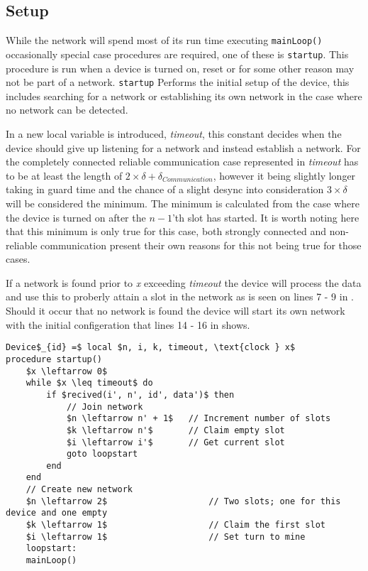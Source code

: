 \subsection{Setup} %
\label{sub:setup} 
While the network will spend most of its run time executing \texttt{mainLoop()} occasionally special case procedures are required, one of these is \texttt{startup}.
This procedure is run when a device is turned on, reset or for some other reason may not be part of a network. 
\texttt{startup} Performs the initial setup of the device, this includes searching for a network or establishing its own network in the case where no network can be detected.
 
\bigskip \noindent
In  a new local variable is introduced, \textit{timeout}, this constant decides when the device should give up listening for a network and instead establish a network.
For the completely connected reliable communication case represented in  \textit{timeout} has to be at least the length of $2 \times \delta + \delta_{Communication}$, however it being slightly longer taking in guard time and the chance of a slight desync into consideration $3 \times \delta$ will be considered the minimum.
The minimum is calculated from the case where the device is turned on after the $n-1$'th slot has started.
It is worth noting here that this minimum is only true for this case, both strongly connected and non-reliable communication present their own reasons for this not being true for those cases.

If a network is found prior to \textit{x} exceeding \textit{timeout} the device will process the data and use this to proberly attain a slot in the network as is seen on lines 7 - 9 in .
Should it occur that no network is found the device will start its own network with the initial configeration that lines 14 - 16 in  shows.
\begin{lstlisting}[label=lst:setup,style=pseudocode,mathescape=true,caption={Pseudocode example of the special case procedure startup()}]
Device$_{id} =$ local $n, i, k, timeout, \text{clock } x$
procedure startup()
	$x \leftarrow 0$
	while $x \leq timeout$ do
		if $recived(i', n', id', data')$ then
			// Join network
			$n \leftarrow n' + 1$	// Increment number of slots
			$k \leftarrow n'$		// Claim empty slot
			$i \leftarrow i'$		// Get current slot
			goto loopstart
		end
	end
	// Create new network
	$n \leftarrow 2$					// Two slots; one for this device and one empty
	$k \leftarrow 1$					// Claim the first slot
	$i \leftarrow 1$					// Set turn to mine
	loopstart:
	mainLoop()
\end{lstlisting}   

